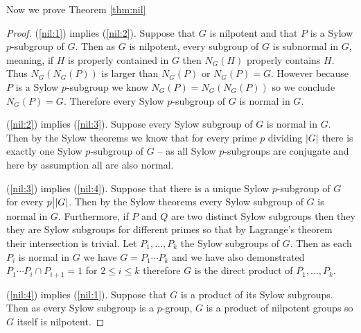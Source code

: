 \documentclass[12pt]{article}
\providecommand{\intersect}{\cap}
\begin{document}
Now we prove Theorem \ref{thm:nil}
\begin{proof}
(\ref{nil:1}) implies (\ref{nil:2}).  Suppose that $G$ is nilpotent and that
$P$ is a Sylow $p$-subgroup of $G$.  Then as $G$ is nilpotent, every subgroup of $G$ is subnormal in $G$, meaning, if $H$ is properly contained in $G$ then $N_G(H)$ properly contains $H$.  Thus $N_G(N_G(P))$ is larger than $N_G(P)$ or $N_G(P)=G$.  However because $P$ is a Sylow $p$-subgroup we know $N_G(P)=N_G(N_G(P))$ so we conclude $N_G(P)=G$.  Therefore every Sylow $p$-subgroup of $G$ is normal in $G$.

(\ref{nil:2}) implies (\ref{nil:3}).  Suppose every Sylow subgroup of $G$ is normal in $G$.  Then by the Sylow theorems we know that for every prime $p$ dividing $|G|$ there is exactly one Sylow $p$-subgroup of $G$ -- as all Sylow $p$-subgroups are conjugate and here by assumption all are also normal.

(\ref{nil:3}) implies (\ref{nil:4}).  Suppose that there is a unique Sylow $p$-subgroup of $G$ for every $p\big{|}|G|$.  Then by the Sylow theorems every Sylow subgroup of $G$ is normal in $G$.  Furthermore, if $P$ and $Q$ are two distinct Sylow subgroups then they they are Sylow subgroups for different primes so that by Lagrange's theorem their intersection is trivial.   Let $P_1,\dots, P_k$ the Sylow subgroups of $G$.  Then as each $P_i$ is normal in $G$ we have
$G=P_1\cdots P_k$ and we have also demonstrated $P_1\cdots P_i\intersect P_{i+1}=1$ for $2\leq i\leq k$ therefore $G$ is the direct product of $P_1,\dots, P_k$.

(\ref{nil:4}) implies (\ref{nil:1}).  Suppose that $G$ is a product of its Sylow subgroups.  Then as every Sylow subgroup is a $p$-group, $G$ is a product of nilpotent groups so $G$ itself is nilpotent.
\end{proof}
\end{document}
